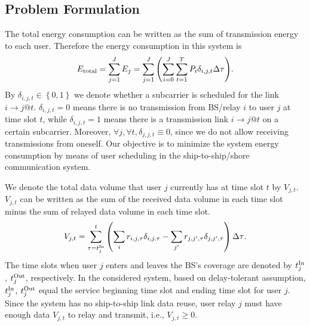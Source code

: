 \documentclass[conference]{IEEEtran}
\begin{document}
 
 \subsection{Problem Formulation}
 
 The total energy consumption can be written as the sum of transmission energy to each user. %
 Therefore the energy consumption in this system is
 \begin{align}
  {{E_{\rm{total}}} = \sum\limits_{j = 1}^J {{E_j}} = \sum\limits_{j = 1}^J {\left( {\sum\limits_{i=0}^{J}{\sum\limits_{t = 1}^T {{P_{i}}\delta _{i,j,t}} } \Delta \tau  }\right)}}. 
  \end{align}
 By $\delta _{i,j,t} \in \left\{ {0,1} \right\}$ we denote whether a subcarrier is scheduled for the link $i \to j @ t$. $ {{\delta _{i,j,t}}} = 0$ means there is no transmission from BS/relay $i$ to user $j$ at time slot $t$, while $ {{\delta _{i,j,t}}} = 1$ means there is a transmission link $i \to j @ t$ on a certain subcarrier. Moreover, $\forall j,\forall t,{\delta _{j,j,t}} \equiv 0$, since we do not allow receiving transmissions from oneself. 
 Our objective is to minimize the system energy consumption by means of user scheduling in the ship-to-ship/shore communication system. 
 
 We denote the total data volume that user $j$ currently has at time slot $t$ by ${V_{j,t}}$. ${V_{j,t}}$ can be written as the sum of the received data volume in each time slot minus the sum of relayed data volume in each time slot. 
 \begin{align}
  {V_{j,t}} = \sum\limits_{\tau = t_j^{{\rm{In}}}}^t {\left( {\sum\limits_i {{r_{i,j,\tau }\delta _{i,j,\tau}}} - \sum\limits_{j'} {{r_{j,j',\tau }\delta _{j,j',\tau}}} } \right) \Delta \tau } .
 \end{align}
 The time slots when user $j$ enters and leaves the BS's coverage are denoted by $t_j^{{\rm{In}}}$, $t_j^{{\rm{Out}}}$, respectively. In the considered system, based on delay-tolerant assumption, $t_j^{{\rm{In}}}$, $t_j^{{\rm{Out}}}$ equal the service beginning time slot and ending time slot for user $j$. 
 Since the system has no ship-to-ship link data reuse, user relay $j$ must have enough data ${V_{j,t}}$ to relay and transmit, i.e., ${V_{j,t} \ge 0}$. 
\end{document}
